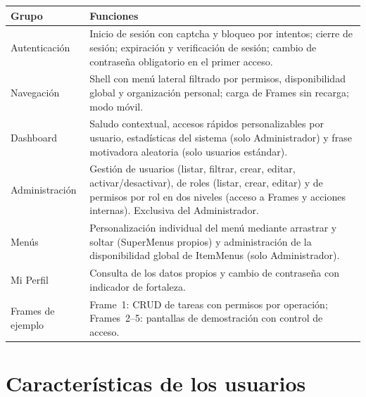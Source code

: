 \begin{longtable}{|p{3.4cm}|p{11.2cm}|}
\hline
\rowcolor{azulcorp!15} \textbf{Grupo} & \textbf{Funciones} \\ \hline
\endhead
Autenticación & Inicio de sesión con captcha y bloqueo por intentos; cierre
                de sesión; expiración y verificación de sesión; cambio de
                contraseña obligatorio en el primer acceso. \\ \hline
Navegación & Shell con menú lateral filtrado por permisos, disponibilidad
             global y organización personal; carga de Frames sin recarga;
             modo móvil. \\ \hline
Dashboard & Saludo contextual, accesos rápidos personalizables por usuario,
            estadísticas del sistema (solo Administrador) y frase motivadora
            aleatoria (solo usuarios estándar). \\ \hline
Administración & Gestión de usuarios (listar, filtrar, crear, editar,
                 activar/desactivar), de roles (listar, crear, editar) y de
                 permisos por rol en dos niveles (acceso a Frames y acciones
                 internas). Exclusiva del Administrador. \\ \hline
Menús & Personalización individual del menú mediante arrastrar y soltar
        (SuperMenus propios) y administración de la disponibilidad global de
        ItemMenus (solo Administrador). \\ \hline
Mi Perfil & Consulta de los datos propios y cambio de contraseña con
            indicador de fortaleza. \\ \hline
Frames de ejemplo & Frame~1: CRUD de tareas con permisos por operación;
                    Frames~2--5: pantallas de demostración con control de
                    acceso. \\ \hline
\end{longtable}

\section{Características de los usuarios}

